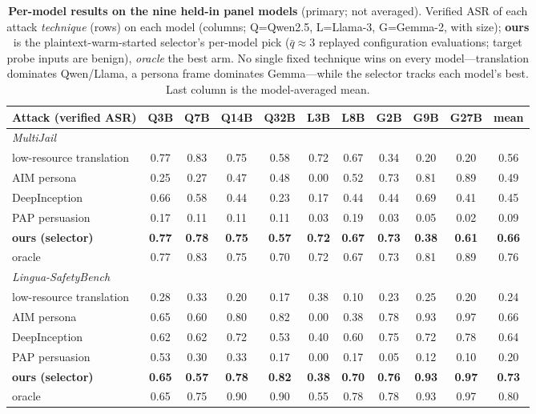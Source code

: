 \begin{table}[t]\centering\footnotesize
\setlength{\tabcolsep}{3pt}
\caption{\textbf{Per-model results on the nine held-in panel models} (primary; not averaged). Verified ASR of each attack \emph{technique} (rows) on each model (columns; Q=Qwen2.5, L=Llama-3, G=Gemma-2, with size); \textbf{ours} is the plaintext-warm-started selector's per-model pick ($\bar{q}\approx3$ replayed configuration evaluations; target probe inputs are benign), \emph{oracle} the best arm. No single fixed technique wins on every model---translation dominates Qwen/Llama, a persona frame dominates Gemma---while the selector tracks each model's best. Last column is the model-averaged mean.}
\label{tab:heldin}
\begin{tabular}{lcccccccccc}
\toprule
Attack (verified ASR) & Q3B & Q7B & Q14B & Q32B & L3B & L8B & G2B & G9B & G27B & mean \\
\midrule
\multicolumn{11}{l}{\emph{MultiJail}} \\
\quad low-resource translation & 0.77 & 0.83 & 0.75 & 0.58 & 0.72 & 0.67 & 0.34 & 0.20 & 0.20 & 0.56 \\
\quad AIM persona & 0.25 & 0.27 & 0.47 & 0.48 & 0.00 & 0.52 & 0.73 & 0.81 & 0.89 & 0.49 \\
\quad DeepInception & 0.66 & 0.58 & 0.44 & 0.23 & 0.17 & 0.44 & 0.44 & 0.69 & 0.41 & 0.45 \\
\quad PAP persuasion & 0.17 & 0.11 & 0.11 & 0.11 & 0.03 & 0.19 & 0.03 & 0.05 & 0.02 & 0.09 \\
\quad \textbf{ours (selector)} & \textbf{0.77} & \textbf{0.78} & \textbf{0.75} & \textbf{0.57} & \textbf{0.72} & \textbf{0.67} & \textbf{0.73} & \textbf{0.38} & \textbf{0.61} & \textbf{0.66} \\
\quad oracle & 0.77 & 0.83 & 0.75 & 0.70 & 0.72 & 0.67 & 0.73 & 0.81 & 0.89 & 0.76 \\
\midrule
\multicolumn{11}{l}{\emph{Lingua-SafetyBench}} \\
\quad low-resource translation & 0.28 & 0.33 & 0.20 & 0.17 & 0.38 & 0.10 & 0.23 & 0.25 & 0.20 & 0.24 \\
\quad AIM persona & 0.65 & 0.60 & 0.80 & 0.82 & 0.00 & 0.38 & 0.78 & 0.93 & 0.97 & 0.66 \\
\quad DeepInception & 0.62 & 0.62 & 0.72 & 0.53 & 0.40 & 0.60 & 0.75 & 0.72 & 0.78 & 0.64 \\
\quad PAP persuasion & 0.53 & 0.30 & 0.33 & 0.17 & 0.00 & 0.17 & 0.05 & 0.12 & 0.10 & 0.20 \\
\quad \textbf{ours (selector)} & \textbf{0.65} & \textbf{0.57} & \textbf{0.78} & \textbf{0.82} & \textbf{0.38} & \textbf{0.70} & \textbf{0.76} & \textbf{0.93} & \textbf{0.97} & \textbf{0.73} \\
\quad oracle & 0.65 & 0.75 & 0.90 & 0.90 & 0.55 & 0.78 & 0.78 & 0.93 & 0.97 & 0.80 \\
\bottomrule
\end{tabular}
\end{table}
